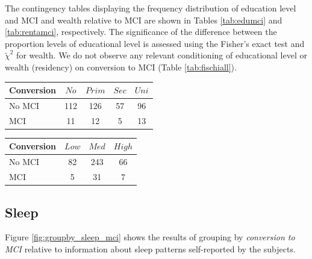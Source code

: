 \documentclass[11pt]{article}
\theoremstyle{definition}
\theoremstyle{remark}
\begin{document}
The contingency tables displaying the frequency distribution of education level and MCI and wealth relative to MCI are shown in Tables \ref{tab:edumci} and \ref{tab:rentamci}, respectively. The significance of the difference between the proportion levels of educational level is assessed using the Fisher's exact test and $\tilde{\chi}^2$ for wealth.
We do not observe any relevant conditioning of educational level or wealth (residency) on conversion to MCI (Table \ref{tab:fischiall}).

\begin{minipage}[b]{.40\textwidth}
   \centering
    \begin{tabular}[t]{lcccc}
    \hline
    Conversion&{$No$}&{$Prim$}&{$Sec$}&{$Uni$} \\
    \hline
    No MCI&112&126&57&96\\
    MCI&11&12&5&13\\
    \hline
  \end{tabular}
   \label{tab:edumci}
\end{minipage}\qquad
\begin{minipage}[b]{.40\textwidth}
   \centering
    \begin{tabular}[t]{lccc}
    \hline
    Conversion&{$Low$}&{$Med$}&{$High$} \\
    \hline
    No MCI&82&243&66\\
    MCI&5&31&7\\
    \hline
  \end{tabular}
   \label{tab:rentamci}
\end{minipage}

\subsection{Sleep}
Figure \ref{fig:groupby_sleep_mci} shows the results of grouping by \emph{conversion to MCI} relative to information about sleep patterns self-reported by the subjects. 
\end{document}
